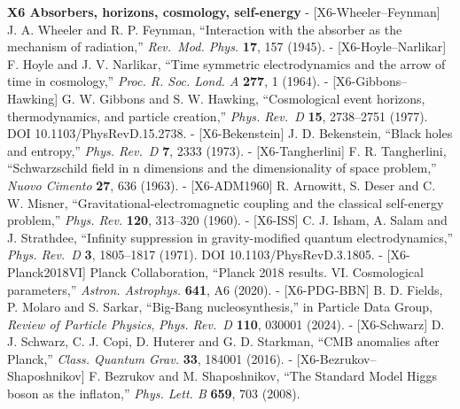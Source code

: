 \documentclass[
  a4paper,
]{article}
\begin{document}
\textbf{X6 Absorbers, horizons, cosmology, self-energy} -
{[}X6-Wheeler--Feynman{]} J. A. Wheeler and R. P. Feynman, ``Interaction
with the absorber as the mechanism of radiation,'' \emph{Rev.~Mod.
Phys.} \textbf{17}, 157 (1945). - {[}X6-Hoyle--Narlikar{]} F. Hoyle and
J. V. Narlikar, ``Time symmetric electrodynamics and the arrow of time
in cosmology,'' \emph{Proc. R. Soc. Lond. A} \textbf{277}, 1 (1964). -
{[}X6-Gibbons--Hawking{]} G. W. Gibbons and S. W. Hawking,
``Cosmological event horizons, thermodynamics, and particle creation,''
\emph{Phys. Rev.~D} \textbf{15}, 2738--2751 (1977). DOI
10.1103/PhysRevD.15.2738. - {[}X6-Bekenstein{]} J. D. Bekenstein,
``Black holes and entropy,'' \emph{Phys. Rev.~D} \textbf{7}, 2333
(1973). - {[}X6-Tangherlini{]} F. R. Tangherlini, ``Schwarzschild field
in n dimensions and the dimensionality of space problem,'' \emph{Nuovo
Cimento} \textbf{27}, 636 (1963). - {[}X6-ADM1960{]} R. Arnowitt, S.
Deser and C. W. Misner, ``Gravitational-electromagnetic coupling and the
classical self-energy problem,'' \emph{Phys. Rev.} \textbf{120},
313--320 (1960). - {[}X6-ISS{]} C. J. Isham, A. Salam and J. Strathdee,
``Infinity suppression in gravity-modified quantum electrodynamics,''
\emph{Phys. Rev.~D} \textbf{3}, 1805--1817 (1971). DOI
10.1103/PhysRevD.3.1805. - {[}X6-Planck2018VI{]} Planck Collaboration,
``Planck 2018 results. VI. Cosmological parameters,'' \emph{Astron.
Astrophys.} \textbf{641}, A6 (2020). - {[}X6-PDG-BBN{]} B. D. Fields, P.
Molaro and S. Sarkar, ``Big-Bang nucleosynthesis,'' in Particle Data
Group, \emph{Review of Particle Physics}, \emph{Phys. Rev.~D}
\textbf{110}, 030001 (2024). - {[}X6-Schwarz{]} D. J. Schwarz, C. J.
Copi, D. Huterer and G. D. Starkman, ``CMB anomalies after Planck,''
\emph{Class. Quantum Grav.} \textbf{33}, 184001 (2016). -
{[}X6-Bezrukov--Shaposhnikov{]} F. Bezrukov and M. Shaposhnikov, ``The
Standard Model Higgs boson as the inflaton,'' \emph{Phys. Lett. B}
\textbf{659}, 703 (2008).
\end{document}
